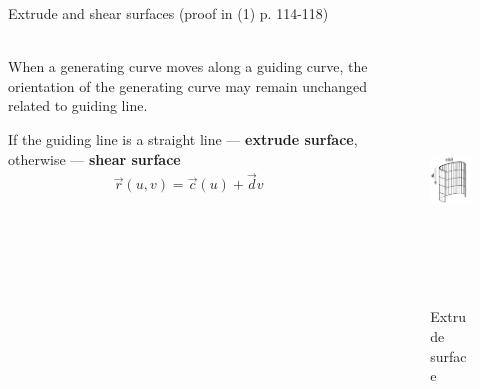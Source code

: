 \documentclass[aspectratio=169]{beamer}
\begin{document}
\begin{frame}[t]{Extrude and shear surfaces (proof in (1) p. 114-118)}
\framesubtitle{}
    \begin{columns}[T,onlytextwidth]
        \begin{column}{0.49\textwidth}
            When a generating curve moves along a guiding curve, the orientation of the generating curve may remain unchanged related to guiding line. 
            
            If the guiding line is a straight line --- \textbf{extrude surface}, otherwise --- \textbf{shear surface}
            \begin{align*}
                \vec{r}(u,v) = \vec{c}(u) + \vec{d}v
            \end{align*}
        \end{column}
        \begin{column}{0.49\textwidth}
            \vspace{-0.5cm}
            \begin{figure}[H]
                \centering\includegraphics[height=6.5cm,width=1\textwidth,keepaspectratio]{extruded_surface_book.png}
                \caption*{Extrude surface}
                \label{fig:extruded_surface_book.png}
            \end{figure}
        \end{column}
    \end{columns}
\end{frame}
\end{document}
